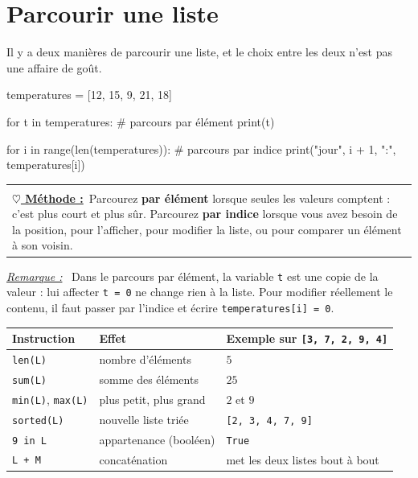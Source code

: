\documentclass[a4paper,11pt,openany]{book}
\makeatletter
\newcommand{\code}[1]{\texttt{\textcolor{codebleu}{#1}}}
\newenvironment{cadre}%
 {\par\vspace{2mm}\noindent\begin{tabular}{|@{\hspace{4mm}}p{0.93\textwidth}@{\hspace{4mm}}|}
  \hline \\[-2mm]}%
 {\\[2mm] \hline \end{tabular}\par\vspace{3mm}}
\newcommand{\methode}{\textbf{\underline{$\heartsuit$ Méthode :}}~}
\newenvironment{remarque}%
 {\par\vspace{1mm}\begin{list}{}{\leftmargin=1cm \rightmargin=0.5cm}\item[]%
  \textit{\underline{Remarque :}}~}%
 {\end{list}\vspace{1mm}}
\renewcommand{\arraystretch}{1.4}
\makeatother
\begin{document}
\section{Parcourir une liste}

Il y a deux manières de parcourir une liste, et le choix entre les deux n'est pas une affaire de goût.

\begin{python}
temperatures = [12, 15, 9, 21, 18]

for t in temperatures:        # parcours par élément
    print(t)

for i in range(len(temperatures)):   # parcours par indice
    print("jour", i + 1, ":", temperatures[i])
\end{python}

\begin{cadre}
\methode Parcourez \textbf{par élément} lorsque seules les valeurs comptent : c'est plus court et plus sûr. Parcourez \textbf{par indice} lorsque vous avez besoin de la position, pour l'afficher, pour modifier la liste, ou pour comparer un élément à son voisin.
\end{cadre}

\begin{remarque}
Dans le parcours par élément, la variable \code{t} est une copie de la valeur : lui affecter \code{t = 0} ne change rien à la liste. Pour modifier réellement le contenu, il faut passer par l'indice et écrire \code{temperatures[i] = 0}.
\end{remarque}

\begin{center}
\renewcommand{\arraystretch}{1.5}
\begin{tabular}{|l|l|l|}
\hline
\rowcolor{orange!50} \textbf{Instruction} & \textbf{Effet} & \textbf{Exemple sur \code{[3, 7, 2, 9, 4]}} \\
\hline
\code{len(L)} & nombre d'éléments & $5$ \\
\hline
\code{sum(L)} & somme des éléments & $25$ \\
\hline
\code{min(L)}, \code{max(L)} & plus petit, plus grand & $2$ et $9$ \\
\hline
\code{sorted(L)} & nouvelle liste triée & \code{[2, 3, 4, 7, 9]} \\
\hline
\code{9 in L} & appartenance (booléen) & \code{True} \\
\hline
\code{L + M} & concaténation & met les deux listes bout à bout \\
\hline
\end{tabular}
\end{center}
\end{document}
